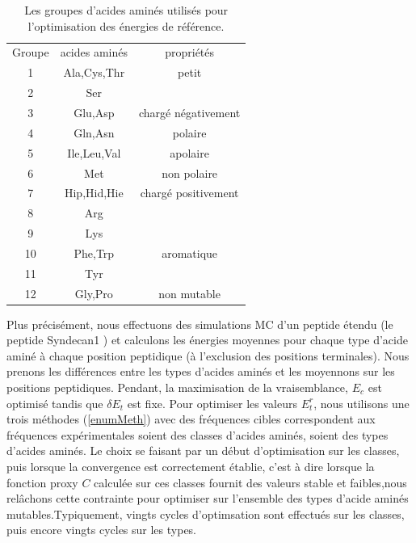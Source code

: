     \begin{table}[!htbp]
      \centering

      \begin{tabular}{ccc}

        \toprule
        Groupe & acides aminés & propriétés\\
        \cmidrule{1-3}

        1   & Ala,Cys,Thr & petit\\
        2   & Ser &\\
        \cmidrule{1-3}
        3   & Glu,Asp & chargé négativement\\
        \cmidrule{1-3}
        4   & Gln,Asn & polaire\\
        \cmidrule{1-3}
        5   & Ile,Leu,Val & apolaire\\
        \cmidrule{1-3}
        6   & Met & non polaire\\
        \cmidrule{1-3}
        7   & Hip,Hid,Hie & chargé positivement\\
        8   & Arg \\
        9   & Lys \\
        \cmidrule{1-3}
        10  & Phe,Trp & aromatique\\
        11  & Tyr \\
        \cmidrule{1-3}
        12  & Gly,Pro & non mutable\\
        \bottomrule


      \end{tabular}      
      \caption{Les groupes d'acides aminés utilisés pour l'optimisation des énergies de référence.}
\label{tab:AAgroups}      
    \end{table}


Plus précisément, nous effectuons des simulations MC d'un peptide étendu (le peptide Syndecan1 ) et calculons les énergies moyennes pour chaque type d'acide aminé à chaque position peptidique (à l'exclusion des positions terminales). Nous prenons les différences entre les types d'acides aminés et les moyennons sur les positions peptidiques.
Pendant, la maximisation de la vraisemblance, $E_c$ est optimisé tandis que $\delta E_t$ est fixe. Pour optimiser les valeurs $E^r_t$, nous utilisons une trois méthodes (\ref{enumMeth}) avec des fréquences cibles correspondent aux fréquences expérimentales soient des classes d'acides aminés, soient des types d'acides aminés. Le choix se faisant par un début d'optimisation sur les classes, puis lorsque la convergence est correctement établie, c'est à dire  lorsque la fonction proxy $C$ calculée sur ces classes fournit des valeurs stable et faibles,nous relâchons cette contrainte pour optimiser sur l'ensemble des types d'acide aminés mutables.Typiquement, vingts cycles d'optimsation sont effectués sur les classes, puis encore vingts cycles sur les types.  



